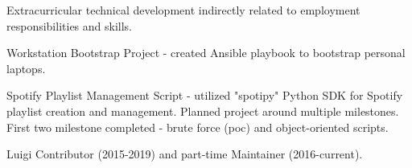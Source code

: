 \documentclass[letter,10pt]{article}
\begin{document}
Extracurricular technical development indirectly related to employment responsibilities and skills.

\begin{zitemize}
    \item Workstation Bootstrap Project - created Ansible playbook to bootstrap personal laptops.
    \item Spotify Playlist Management Script - utilized "spotipy" Python SDK for Spotify playlist creation and management. Planned project around multiple milestones. First two milestone completed - brute force (poc) and object-oriented scripts.
    \item Luigi Contributor (2015-2019) and part-time Maintainer (2016-current).
\end{zitemize}

\vspace{5pt}
\end{document}
